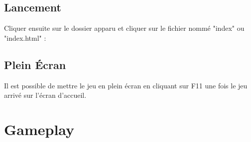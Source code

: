 \documentclass{article}
\begin{document}
\subsection{Lancement}
Cliquer ensuite sur le dossier apparu et cliquer sur le fichier nomm\'e "index" ou "index.html" :
\vspace{0.5cm}\\
\subsection{Plein \'Ecran}
Il est possible de mettre le jeu en plein \'ecran en cliquant sur F11 une fois le jeu arriv\'e sur l'\'ecran d'accueil. 

\section{Gameplay}
\end{document}
